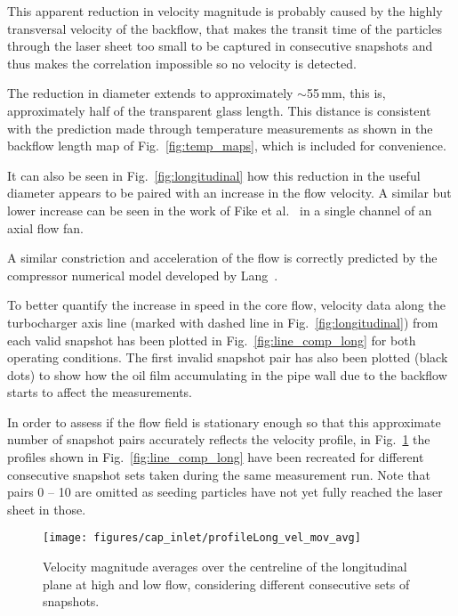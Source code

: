 This apparent reduction in velocity magnitude is probably caused by  the highly transversal velocity of the backflow, that makes the transit time of the particles through the laser sheet too small to be captured in consecutive snapshots and thus makes the correlation impossible so no velocity is detected.

The reduction in diameter extends to approximately $\sim$55\,mm, this is, approximately half of the transparent glass length. This distance is consistent with the prediction made through temperature measurements as shown in the backflow length map of Fig.~\ref{fig:temp_maps}, which is included for convenience.

It can also be seen in Fig.~\ref{fig:longitudinal} how this reduction in the useful diameter appears to be paired with an increase in the flow velocity. A similar but lower increase can be seen in the work of Fike et al.~\cite{fike2014visualisation} in a single channel of an axial flow fan.

A similar constriction and acceleration of the flow is correctly predicted by the compressor numerical model developed by Lang~\cite{lang2011contribucion}.

To better quantify the increase in speed in the core flow, velocity data along the turbocharger axis line (marked with dashed line in Fig.~\ref{fig:longitudinal}) from each valid snapshot has been plotted in Fig.~\ref{fig:line_comp_long} for both operating conditions. The first invalid snapshot pair has also been plotted (black dots) to show how the oil film accumulating in the pipe wall due to the backflow starts to affect the measurements.

In order to assess if the flow field is stationary enough so that this approximate number of snapshot pairs accurately reflects the velocity profile, in Fig.~\ref{fig:line_comp_long_mov_avg} the profiles shown in Fig.~\ref{fig:line_comp_long} have been recreated for different consecutive snapshot sets taken during the same measurement run. Note that pairs 0 -- 10 are omitted as seeding particles have not yet fully reached the laser sheet in those.

\begin{figure}[thb!]
\centering
\texttt{[image: figures/cap\_inlet/profileLong\_vel\_mov\_avg]}
\caption[Velocity magnitude average evolution]{Velocity magnitude averages over the centreline of the longitudinal plane at high and low flow, considering different consecutive sets of snapshots.}
\label{fig:line_comp_long_mov_avg}
\end{figure}

